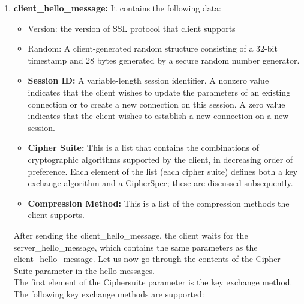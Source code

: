 \documentclass[11pt]{article}
\begin{document}
\begin{enumerate}
    \item \textbf{client\_hello\_message:} It contains the following data:
    \begin{itemize}
        \item Version: the version of SSL protocol that client supports
        \item Random: A client-generated random structure consisting of a 32-bit timestamp and 28 bytes generated by a secure random number generator.
        \item \textbf{Session ID:} A variable-length session identifier. A nonzero value indicates that the client wishes to update the parameters of an existing connection or to create a new connection on this session. A zero value indicates that the client wishes to establish a new connection on a new session.
        \item \textbf{Cipher Suite:} This is a list that contains the combinations of cryptographic algorithms supported by the client, in decreasing order of preference. Each element of the list (each cipher suite) defines both a key exchange algorithm and a CipherSpec; these are discussed subsequently.
        \item \textbf{Compression Method:} This is a list of the compression methods the client supports.
    \end{itemize}
    After sending the client\_hello\_message, the client waits for the server\_hello\_message, which contains the same parameters as the client\_hello\_message. Let us now go through the contents of the Cipher Suite parameter in the hello messages.\\
    \newline
    The first element of the Ciphersuite parameter is the key exchange method. The following key exchange methods are supported:
    

\end{enumerate}
\end{document}
